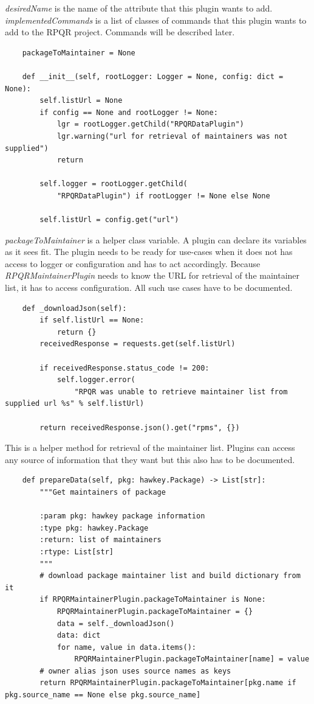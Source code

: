 \textit{desiredName} is the name of the attribute that this plugin wants to add. \textit{implementedCommands}
is a list of classes of commands that this plugin wants to add to the RPQR project. Commands will be described
later.

\begin{lstlisting}
    packageToMaintainer = None

    def __init__(self, rootLogger: Logger = None, config: dict = None):
        self.listUrl = None
        if config == None and rootLogger != None:
            lgr = rootLogger.getChild("RPQRDataPlugin")
            lgr.warning("url for retrieval of maintainers was not supplied")
            return

        self.logger = rootLogger.getChild(
            "RPQRDataPlugin") if rootLogger != None else None

        self.listUrl = config.get("url")
\end{lstlisting}

\textit{packageToMaintainer} is a helper class variable. A plugin can declare its variables as it sees
fit. The plugin needs to be ready for use-cases when it does not has access to logger or configuration
and has to act accordingly. Because \textit{RPQRMaintainerPlugin} needs to know the URL for retrieval
of the maintainer list, it has to access configuration. All such use cases have to be documented.

\newpage

\begin{lstlisting}
    def _downloadJson(self):
        if self.listUrl == None:
            return {}
        receivedResponse = requests.get(self.listUrl)

        if receivedResponse.status_code != 200:
            self.logger.error(
                "RPQR was unable to retrieve maintainer list from supplied url %s" % self.listUrl)

        return receivedResponse.json().get("rpms", {})
\end{lstlisting}

This is a helper method for retrieval of the maintainer list. Plugins can access any source of information
that they want but this also has to be documented.

\begin{lstlisting}
    def prepareData(self, pkg: hawkey.Package) -> List[str]:
        """Get maintainers of package

        :param pkg: hawkey package information
        :type pkg: hawkey.Package
        :return: list of maintainers
        :rtype: List[str]
        """
        # download package maintainer list and build dictionary from it
        if RPQRMaintainerPlugin.packageToMaintainer is None:
            RPQRMaintainerPlugin.packageToMaintainer = {}
            data = self._downloadJson()
            data: dict
            for name, value in data.items():
                RPQRMaintainerPlugin.packageToMaintainer[name] = value
        # owner alias json uses source names as keys
        return RPQRMaintainerPlugin.packageToMaintainer[pkg.name if pkg.source_name == None else pkg.source_name]
\end{lstlisting}

